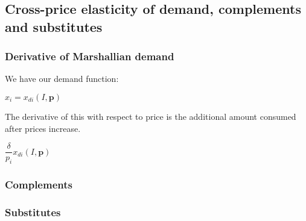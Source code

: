 
\subsection{Cross-price elasticity of demand, complements and substitutes}

\subsubsection{Derivative of Marshallian demand}

We have our demand function:

\(x_i=x_{di}(I, \mathbf p)\)

The derivative of this with respect to price is the additional amount consumed after prices increase.

\(\dfrac{\delta }{p_i}x_{di}(I, \mathbf p)\)

\subsubsection{Complements}

\subsubsection{Substitutes}

